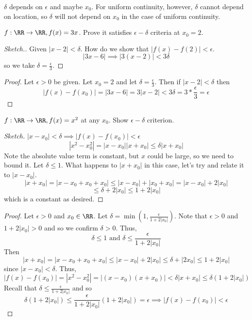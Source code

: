\documentclass[12pt]{scrartcl}
\begin{document}
\begin{note}
  $\delta$ depends on $\epsilon$ and maybe $x_0$. For uniform continuity, however, $\delta$ 
  cannot depend on location, so $\delta$ will not depend on $x_0$ in the case of 
  uniform continuity.
\end{note}

\begin{example}
  $f: \RR \to \RR, f(x) = 3x$. Prove it satisfies $\epsilon-\delta$ criteria at 
  $x_0 = 2$. 

  \begin{proof}[Sketch.]
    Given $|x - 2| < \delta$. How do we show that $|f(x) - f(2)| < \epsilon$. 
    \[|3x-6| \implies |3(x-2)| < 3\delta\]
    so we take $\delta = \frac{\epsilon}{3}$. 
  \end{proof}

  \begin{proof}
    Let $\epsilon > 0$ be given. Let $x_0 = 2$ and let $\delta = \frac{\epsilon}{3}$. 
    Then if $|x-2| < \delta$ then 
    \[|f(x) - f(x_0)| = |3x-6| = 3|x-2| < 3\delta = 3 * \frac{\epsilon}{3} = \epsilon\]
  \end{proof}
\end{example}

\begin{example}
  
  $f: \RR\to\RR, f(x) = x^2$ at any $x_0$. Show $\epsilon-\delta$ criterion.

  \begin{proof}[Sketch]
    $|x-x_0| < \delta \implies |f(x) - f(x_0)| < \epsilon$
    \[|x^2 - x_0^2| = |x-x_0||x+x_0| \leq \delta |x + x_0|\]
    Note the absolute value term is constant, but $x$ could be large, so we need to bound it. 
    Let $\delta \leq 1$. What happens to $|x + x_0|$ in this case, let's try and relate it to 
    $|x-x_0|$. 
    \[|x + x_0| = |x - x_0 + x_0 + x_0| \leq |x-x_0| + |x_0 + x_0| = |x-x_0| + 2|x_0|\]
    \[\leq \delta + 2|x_0| \leq 1 + 2|x_0|\]
    which is a constant as desired. 
  \end{proof}

  \begin{proof}
    Let $\epsilon > 0$ and $x_0\in\RR$. Let $\delta = \min(1, \frac{\epsilon}{1 + 2|x_0|})$. Note that 
    $\epsilon > 0$ and $1 + 2|x_0| > 0$ and so we confirm $\delta > 0$. Thus, 
    \[\delta \leq 1 \text{ and } \delta \leq \frac{\epsilon}{1 + 2|x_0|}\]
    Then
    \[|x + x_0| = |x -x_0 + x_0 + x_0| \leq |x-x_0| + 2|x_0| \leq \delta + |2x_0| \leq 1 + 2|x_0|\]
    since $|x-x_0| < \delta$. Thus, 
    \[|f(x) - f(x_0)| = |x^2 - x_0^2| = |(x-x_0)(x+x_0)| < \delta |x+x_0| \leq \delta (1 + 2|x_0|)\]
    Recall that $\delta \leq \frac{\epsilon}{1 + 2|x_0|}$ and so 
    \[\delta (1 + 2|x_0|) \leq \frac{\epsilon}{1 + 2|x_0|}(1 + 2|x_0|) = \epsilon \implies |f(x) - f(x_0)| < \epsilon\]
  \end{proof}
\end{example}
\end{document}
